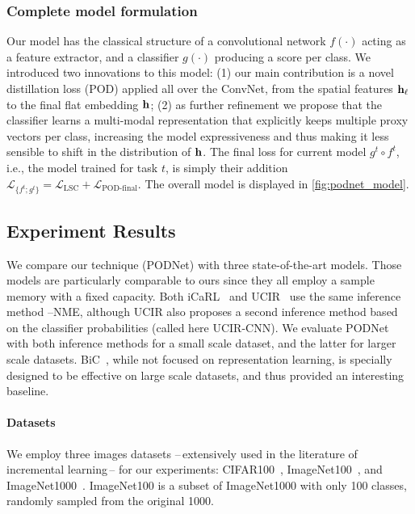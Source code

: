 \subsubsection{Complete model formulation}
\label{sec:podnet_modelsummary}

Our model has the classical structure of a convolutional network $f(\cdot)$ acting as a feature
extractor, and a classifier $g(\cdot)$ producing a score per class. We introduced two innovations to
this model: (1) our main contribution is a novel distillation loss (POD) applied all over the
\ac{ConvNet}, from the spatial features $\mathbf{h}_\ell$ to the final flat embedding $\mathbf{h}$; (2) as further
refinement we propose that the classifier learns a multi-modal representation that explicitly keeps
multiple proxy vectors per class, increasing the model expressiveness and thus making it less
sensible to shift in the distribution of $\mathbf{h}$. The final loss for current model $g^t \circ f^t$,
i.e., the model trained for task $t$, is simply their addition $\mathcal{L}_{\{f^t; g^t\}} =
    \mathcal{L}_\textrm{LSC} + \mathcal{L}_\textrm{POD-final}$. The overall model is displayed in
\autoref{fig:podnet_model}.

\subsection{Experiment Results}
\label{sec:podnet_exp}

We compare our technique (PODNet) with three state-of-the-art models. Those models are particularly
comparable to ours since they all employ a sample memory with a fixed capacity. Both
iCaRL~\citep{rebuffi2017icarl} and UCIR~\citep{hou2019ucir} use the same inference method
--\ac{NME}, although UCIR also proposes a second inference method based on the classifier
probabilities (called here UCIR-CNN). We evaluate PODNet with both inference methods for a small
scale dataset, and the latter for larger scale datasets. BiC~\citep{wu2019bias_correction}, while
not focused on representation learning, is specially designed to be effective on large scale
datasets, and thus provided an interesting baseline.

\paragraph{Datasets} We employ three images datasets --\,extensively used in the literature of
incremental learning\,-- for our experiments: CIFAR100~\citep{krizhevskycifar100},
ImageNet100~\citep{deng2009imagenet,hou2019ucir,wu2019bias_correction}, and
ImageNet1000~\citep{deng2009imagenet}. ImageNet100 is a subset of ImageNet1000 with only 100
classes, randomly sampled from the original 1000.

